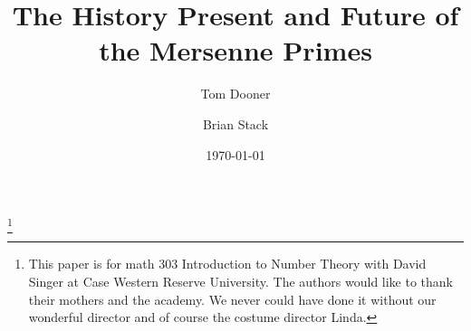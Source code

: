 \documentclass[11pt]{amsart}
\theoremstyle{definition}
\numberwithin{equation}{section}
\begin{document}
\title{The History Present and Future of the Mersenne Primes}
\date{\today}


\thanks{This paper is for math 303 Introduction to Number Theory with David Singer at Case Western Reserve University. The authors would like to thank their mothers and the academy. We never could have done it without our wonderful director and of course the costume director Linda.}

\author{Tom Dooner}
\address{Case Western Reserve University, 
Cleveland, OH 44106}

\author{Brian Stack}
\address{Case Western Reserve University, 
Cleveland, OH 44106}

\maketitle








\end{document}
